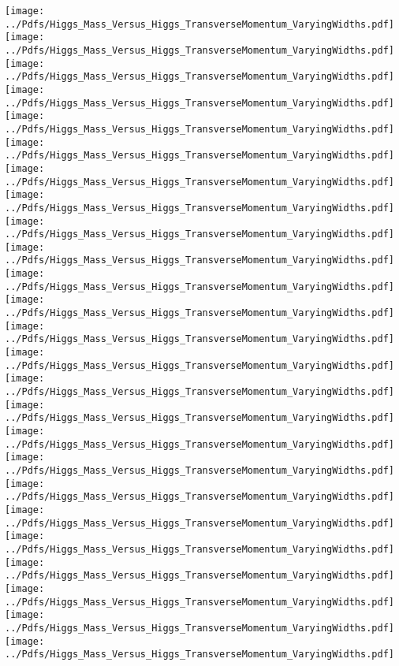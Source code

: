 \documentclass[a4wide,10pt]{article}
\begin{document}
\texttt{[image: ../Pdfs/Higgs\_Mass\_Versus\_Higgs\_TransverseMomentum\_VaryingWidths.pdf]}
\texttt{[image: ../Pdfs/Higgs\_Mass\_Versus\_Higgs\_TransverseMomentum\_VaryingWidths.pdf]}
\texttt{[image: ../Pdfs/Higgs\_Mass\_Versus\_Higgs\_TransverseMomentum\_VaryingWidths.pdf]}
\texttt{[image: ../Pdfs/Higgs\_Mass\_Versus\_Higgs\_TransverseMomentum\_VaryingWidths.pdf]}
\texttt{[image: ../Pdfs/Higgs\_Mass\_Versus\_Higgs\_TransverseMomentum\_VaryingWidths.pdf]}
\texttt{[image: ../Pdfs/Higgs\_Mass\_Versus\_Higgs\_TransverseMomentum\_VaryingWidths.pdf]}
\texttt{[image: ../Pdfs/Higgs\_Mass\_Versus\_Higgs\_TransverseMomentum\_VaryingWidths.pdf]}
\texttt{[image: ../Pdfs/Higgs\_Mass\_Versus\_Higgs\_TransverseMomentum\_VaryingWidths.pdf]}
\texttt{[image: ../Pdfs/Higgs\_Mass\_Versus\_Higgs\_TransverseMomentum\_VaryingWidths.pdf]}
\texttt{[image: ../Pdfs/Higgs\_Mass\_Versus\_Higgs\_TransverseMomentum\_VaryingWidths.pdf]}
\texttt{[image: ../Pdfs/Higgs\_Mass\_Versus\_Higgs\_TransverseMomentum\_VaryingWidths.pdf]}
\texttt{[image: ../Pdfs/Higgs\_Mass\_Versus\_Higgs\_TransverseMomentum\_VaryingWidths.pdf]}
\texttt{[image: ../Pdfs/Higgs\_Mass\_Versus\_Higgs\_TransverseMomentum\_VaryingWidths.pdf]}
\texttt{[image: ../Pdfs/Higgs\_Mass\_Versus\_Higgs\_TransverseMomentum\_VaryingWidths.pdf]}
\texttt{[image: ../Pdfs/Higgs\_Mass\_Versus\_Higgs\_TransverseMomentum\_VaryingWidths.pdf]}
\texttt{[image: ../Pdfs/Higgs\_Mass\_Versus\_Higgs\_TransverseMomentum\_VaryingWidths.pdf]}
\texttt{[image: ../Pdfs/Higgs\_Mass\_Versus\_Higgs\_TransverseMomentum\_VaryingWidths.pdf]}
\texttt{[image: ../Pdfs/Higgs\_Mass\_Versus\_Higgs\_TransverseMomentum\_VaryingWidths.pdf]}
\texttt{[image: ../Pdfs/Higgs\_Mass\_Versus\_Higgs\_TransverseMomentum\_VaryingWidths.pdf]}
\texttt{[image: ../Pdfs/Higgs\_Mass\_Versus\_Higgs\_TransverseMomentum\_VaryingWidths.pdf]}
\texttt{[image: ../Pdfs/Higgs\_Mass\_Versus\_Higgs\_TransverseMomentum\_VaryingWidths.pdf]}
\texttt{[image: ../Pdfs/Higgs\_Mass\_Versus\_Higgs\_TransverseMomentum\_VaryingWidths.pdf]}
\texttt{[image: ../Pdfs/Higgs\_Mass\_Versus\_Higgs\_TransverseMomentum\_VaryingWidths.pdf]}
\texttt{[image: ../Pdfs/Higgs\_Mass\_Versus\_Higgs\_TransverseMomentum\_VaryingWidths.pdf]}
\texttt{[image: ../Pdfs/Higgs\_Mass\_Versus\_Higgs\_TransverseMomentum\_VaryingWidths.pdf]}
\end{document}
